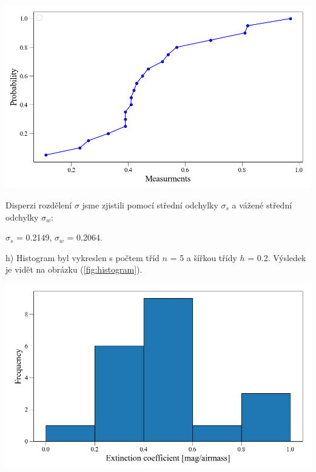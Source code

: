 \documentclass[a4paper,11pt]{article}
\begin{document}
    \begin{minipage}[t]{0.5\textwidth} 
        \vspace{10pt}   
        \par \centering
        \includegraphics[scale=0.33]{com_dist}
        \captionsetup{justification=centering, font=footnotesize}
        \label{fig:com_dist}
        \vspace{10pt}
        \raggedright 
        
        \par Disperzi rozdělení $\sigma$ jsme zjistili pomocí střední odchylky $\sigma_s$ a vážené střední odchylky $\sigma_w$:
        \begin{center}
            $\sigma_s$ = 0.2149, $\sigma_w$ = 0.2064.
        \end{center}
        \par h) Histogram byl vykreslen s počtem tříd $n$ = 5 a šířkou třídy $h$ = 0.2. Výsledek je vidět na obrázku (\ref{fig:histogram}).

        \vspace{10pt}   
        \par \centering
        \includegraphics[scale=0.33]{histogram}
        \captionsetup{justification=centering, font=footnotesize}
        \label{fig:histogram}
        \vspace{10pt}
        \raggedright 


\end{minipage}
\end{document}
